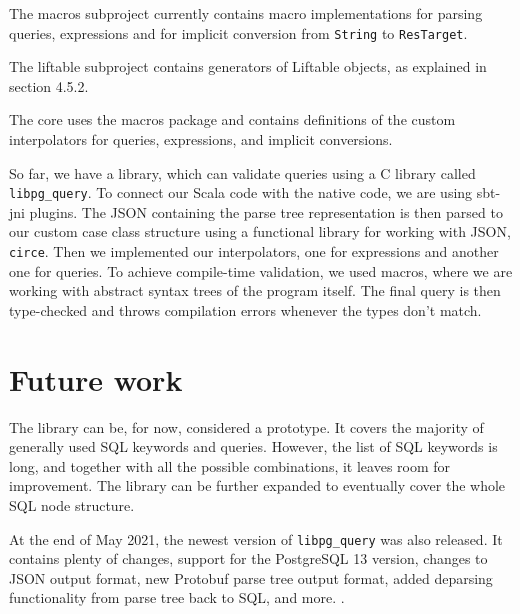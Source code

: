 \begin{description}[font=$\bullet$~\normalfont\scshape\color{black}\\]
The macros subproject currently contains macro implementations for parsing queries, expressions and for implicit conversion from \texttt{String} to \texttt{ResTarget}.

The liftable subproject contains generators of Liftable objects, as explained in section 4.5.2.
\item [Core] \hfill \newline
The core uses the macros package and contains definitions of the custom interpolators for queries, expressions, and implicit conversions.

\end{description}
So far, we have a library, which can validate queries using a C library called \texttt{libpg\_query}. To connect our Scala code with the native code, we are using sbt-jni plugins. The JSON containing the parse tree representation is then parsed to our custom case class structure using a functional library for working with JSON, \texttt{circe}. Then we implemented our interpolators, one for expressions and another one for queries. To achieve compile-time validation, we used macros, where we are working with abstract syntax trees of the program itself. The final query is then type-checked and throws compilation errors whenever the types don't match.


\section{Future work}
The library can be, for now, considered a prototype. It covers the majority of generally used SQL keywords and queries. However, the list of SQL keywords is long, and together with all the possible combinations, it leaves room for improvement. The library can be further expanded to eventually cover the whole SQL node structure. 

At the end of May 2021, the newest version of \texttt{libpg\_query} was also released. It contains plenty of changes, support for the PostgreSQL 13 version, changes to JSON output format, new Protobuf parse tree output format, added deparsing functionality from parse tree back to SQL, and more. \cite{libpgquery13}. 
